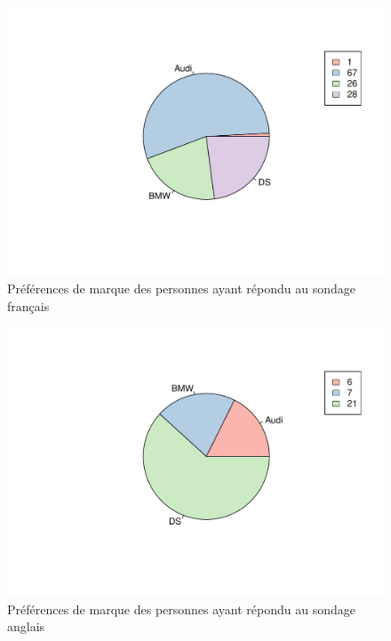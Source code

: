 \documentclass[12pt]{article}\usepackage[]{graphicx}\usepackage[]{color}
\makeatletter
\def\maxwidth{ %
  \ifdim\Gin@nat@width>\linewidth
    \linewidth
  \else
    \Gin@nat@width
  \fi
}
\newenvironment{knitrout}{}{} %
\makeatother
\begin{document}
\begin{knitrout}
\color{fgcolor}\begin{figure}[H]
\includegraphics[width=\maxwidth]{figure/preference_fr-1} \caption[Préférences de marque des personnes ayant répondu au sondage français]{Préférences de marque des personnes ayant répondu au sondage français}\label{fig:preference fr}
\end{figure}


\end{knitrout}

\begin{knitrout}
\color{fgcolor}\begin{figure}[H]
\includegraphics[width=\maxwidth]{figure/preference_en-1} \caption[Préférences de marque des personnes ayant répondu au sondage anglais]{Préférences de marque des personnes ayant répondu au sondage anglais}\label{fig:preference en}
\end{figure}


\end{knitrout}
\end{document}
